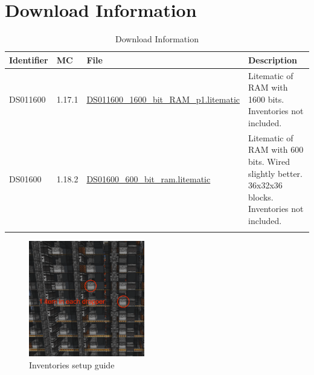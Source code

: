 \documentclass[10pt]{datasheet}
\begin{document}
\section{Download Information}
\begin{table}[h]
    \caption{Download Information}
    \begin{tabularx}{\textwidth}{l | l | l | X}
        \thickhline
        \textbf{Identifier} & \textbf{MC} & \textbf{File} & \textbf{Description} \\
        \hline
        DS011600 & 1.17.1 & \href{https://github.com/Soontech-Annals/Archive/blob/364bde8dbcbc2e5337489ff435bcda9b387017e2/Archive/data-storage/DS01\%20Streamable\%20Bit\%20RAM/DS011600\_1600\_bit\_RAM\_p1.litematic?raw=1}{DS011600\_1600\_bit\_RAM\_p1.litematic} & Litematic of RAM with 1600 bits. Inventories not included. \\
        \hline
        DS01600 & 1.18.2 & \href{https://github.com/Soontech-Annals/Archive/blob/364bde8dbcbc2e5337489ff435bcda9b387017e2/Archive/data-storage/DS01\%20Streamable\%20Bit\%20RAM/DS01600\_600\_bit\_ram.litematic?raw=1}{DS01600\_600\_bit\_ram.litematic} & Litematic of RAM with 600 bits. Wired slightly better. 36x32x36 blocks. Inventories not included. \\
        \thickhline
    \end{tabularx}
\end{table}

\begin{figure}[h]
    \includegraphics[width=0.45\textwidth]{invs.png}
    \caption{Inventories setup guide}
\end{figure}
\end{document}
